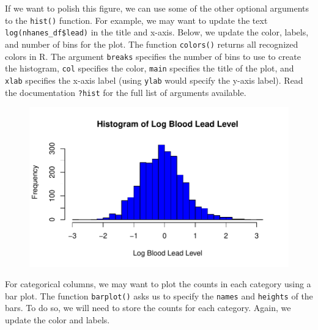 \documentclass[
  letterpaper,
]{krantz}
\makeatletter
\newenvironment{Shaded}{\begin{snugshade}}{\end{snugshade}}
\newcommand{\AttributeTok}[1]{\textcolor[rgb]{0.40,0.45,0.13}{#1}}
\newcommand{\DecValTok}[1]{\textcolor[rgb]{0.68,0.00,0.00}{#1}}
\newcommand{\FunctionTok}[1]{\textcolor[rgb]{0.28,0.35,0.67}{#1}}
\newcommand{\NormalTok}[1]{\textcolor[rgb]{0.00,0.23,0.31}{#1}}
\newcommand{\SpecialCharTok}[1]{\textcolor[rgb]{0.37,0.37,0.37}{#1}}
\newcommand{\StringTok}[1]{\textcolor[rgb]{0.13,0.47,0.30}{#1}}
\newenvironment{kframe}{%
\medskip{}
\setlength{\fboxsep}{.8em}
 \def\at@end@of@kframe{}%
 \ifinner\ifhmode%
  \def\at@end@of@kframe{\end{minipage}}%
  \begin{minipage}{\columnwidth}%
 \fi\fi%
 \def\FrameCommand##1{\hskip\@totalleftmargin \hskip-\fboxsep
 \colorbox{shadecolor}{##1}\hskip-\fboxsep
     \hskip-\linewidth \hskip-\@totalleftmargin \hskip\columnwidth}%
 \MakeFramed {\advance\hsize-\width
   \@totalleftmargin\z@ \linewidth\hsize
   \@setminipage}}%
 {\par\unskip\endMakeFramed%
 \at@end@of@kframe}
\renewenvironment{Shaded}{\begin{kframe}}{\end{kframe}}
\makeatother
\begin{document}
If we want to polish this figure, we can use some of the other optional
arguments to the \texttt{hist()} function. For example, we may want to
update the text \texttt{log(nhanes\_df\$lead)} in the title and x-axis.
Below, we update the color, labels, and number of bins for the plot. The
function \texttt{colors()} returns all recognized colors in R. The
argument \texttt{breaks} specifies the number of bins to use to create
the histogram, \texttt{col} specifies the color, \texttt{main} specifies
the title of the plot, and \texttt{xlab} specifies the x-axis label
(using \texttt{ylab} would specify the y-axis label). Read the
documentation \texttt{?hist} for the full list of arguments available.

\begin{Shaded}
\end{Shaded}

\begin{figure}[H]

{\centering \includegraphics[width=1\textwidth,height=\textheight]{book/4_exploratory_analysis_files/figure-pdf/unnamed-chunk-9-1.pdf}

}

\end{figure}

For categorical columns, we may want to plot the counts in each category
using a bar plot. The function \texttt{barplot()} asks us to specify the
\texttt{names} and \texttt{heights} of the bars. To do so, we will need
to store the counts for each category. Again, we update the color and
labels.
\end{document}
